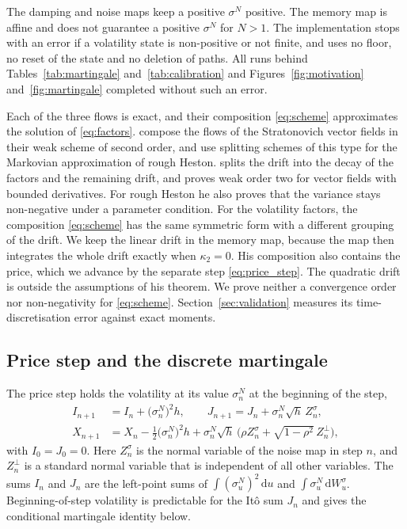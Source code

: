 \documentclass[11pt,a4paper]{article}
\theoremstyle{definition}
\newcommand{\D}{\mathrm{d}}
\begin{document}
The damping and noise maps keep a positive $\sigma^N$ positive. The memory map is affine and does not guarantee a positive $\sigma^N$ for $N>1$. The implementation stops with an error if a volatility state is non-positive or not finite, and uses no floor, no reset of the state and no deletion of paths. All runs behind Tables~\ref{tab:martingale} and~\ref{tab:calibration} and Figures~\ref{fig:motivation} and~\ref{fig:martingale} completed without such an error.

Each of the three flows is exact, and their composition \eqref{eq:scheme} approximates the solution of \eqref{eq:factors}. \citet{NinomiyaVictoir2008} compose the flows of the Stratonovich vector fields in their weak scheme of second order, and \citet{BayerBreneis2024} use splitting schemes of this type for the Markovian approximation of rough Heston. \citet{Shinozaki2026} splits the drift into the decay of the factors and the remaining drift, and proves weak order two for vector fields with bounded derivatives. For rough Heston he also proves that the variance stays non-negative under a parameter condition. For the volatility factors, the composition \eqref{eq:scheme} has the same symmetric form with a different grouping of the drift. We keep the linear drift in the memory map, because the map then integrates the whole drift exactly when $\kappa_2=0$. His composition also contains the price, which we advance by the separate step \eqref{eq:price_step}. The quadratic drift is outside the assumptions of his theorem. We prove neither a convergence order nor non-negativity for \eqref{eq:scheme}. Section~\ref{sec:validation} measures its time-discretisation error against exact moments.

\subsection{Price step and the discrete martingale}\label{sec:price_step}

The price step holds the volatility at its value $\sigma^N_n$ at the beginning of the step,
\begin{equation}\label{eq:price_step}
\begin{split}
I_{n+1}&=I_n+\big(\sigma^N_n\big)^2h,\qquad J_{n+1}=J_n+\sigma^N_n\sqrt h\,Z^\sigma_n,\\
X_{n+1}&=X_n-\tfrac12\big(\sigma^N_n\big)^2h+\sigma^N_n\sqrt h\,\Big(\rho Z^\sigma_n+\sqrt{1-\rho^2}\,Z^\perp_n\Big),
\end{split}
\end{equation}
with $I_0=J_0=0$. Here $Z^\sigma_n$ is the normal variable of the noise map in step $n$, and $Z^\perp_n$ is a standard normal variable that is independent of all other variables. The sums $I_n$ and $J_n$ are the left-point sums of $\int(\sigma^N_u)^2\,\D u$ and $\int\sigma^N_u\,\D W^\sigma_u$. Beginning-of-step volatility is predictable for the It\^o sum $J_n$ and gives the conditional martingale identity below.
\end{document}
